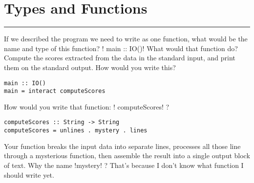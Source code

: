 
 \newpage
\section{Types and Functions} 
\vspace{10cm}
\hrule

\lhQ If we described the program we need to write as one function, what would be the name and type of this function? 
\lhA \il! main :: IO()!
\lhN What would that function do?
\lhA Compute the scores extracted from the data in the standard input, and print them on the standard output.
\lhN How would you write this?
\lhA \begin{lstlisting}[frame=single] 
main :: IO()
main = interact computeScores
\end{lstlisting}
\lhN How would you write that function: \il! computeScores! ?
\lhA \begin{lstlisting}[frame=single] 
computeScores :: String -> String
computeScores = unlines . mystery . lines
\end{lstlisting}
\lhN Your function breaks the input data into separate lines, processes all those line through a mysterious function, then assemble the result into a single output block of text. Why the name \il!mystery! ?  
\lhA That's because I don't know what function I should write yet.

\lhend


